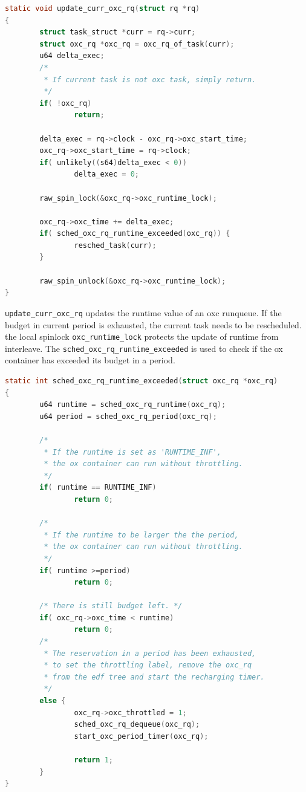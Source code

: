 \begin{lstlisting}[language=C, 
		caption={To update an ox container's runtime information}]
static void update_curr_oxc_rq(struct rq *rq)
{
        struct task_struct *curr = rq->curr;
        struct oxc_rq *oxc_rq = oxc_rq_of_task(curr);
        u64 delta_exec;
        /*
         * If current task is not oxc task, simply return.
         */
        if( !oxc_rq)
                return;

        delta_exec = rq->clock - oxc_rq->oxc_start_time;
        oxc_rq->oxc_start_time = rq->clock;
        if( unlikely((s64)delta_exec < 0))
                delta_exec = 0;

        raw_spin_lock(&oxc_rq->oxc_runtime_lock);

        oxc_rq->oxc_time += delta_exec;
        if( sched_oxc_rq_runtime_exceeded(oxc_rq)) {
                resched_task(curr);
        }

        raw_spin_unlock(&oxc_rq->oxc_runtime_lock);
}
\end{lstlisting}

\texttt{update\_curr\_oxc\_rq} updates the runtime value of 
an oxc runqueue. If the budget in current period is exhausted, the
current task needs to be rescheduled. the local spinlock 
\texttt{oxc\_runtime\_lock} protects the update of runtime from
interleave. The \texttt{sched\_oxc\_rq\_runtime\_exceeded} is
used to check if the ox container has exceeded its budget in a
period.

\begin{lstlisting}[language=C, 
	caption={To check if an ox container should be throttled}]
static int sched_oxc_rq_runtime_exceeded(struct oxc_rq *oxc_rq)
{
        u64 runtime = sched_oxc_rq_runtime(oxc_rq);
        u64 period = sched_oxc_rq_period(oxc_rq);

        /* 
         * If the runtime is set as 'RUNTIME_INF',
         * the ox container can run without throttling.
         */
        if( runtime == RUNTIME_INF)
                return 0;

        /* 
         * If the runtime to be larger the the period,
         * the ox container can run without throttling.
         */
        if( runtime >=period)
                return 0;

        /* There is still budget left. */
        if( oxc_rq->oxc_time < runtime)
                return 0;
        /* 
         * The reservation in a period has been exhausted,
         * to set the throttling label, remove the oxc_rq
         * from the edf tree and start the recharging timer.
         */
        else {
                oxc_rq->oxc_throttled = 1;
                sched_oxc_rq_dequeue(oxc_rq);
                start_oxc_period_timer(oxc_rq);

                return 1;
        }
}
\end{lstlisting}

